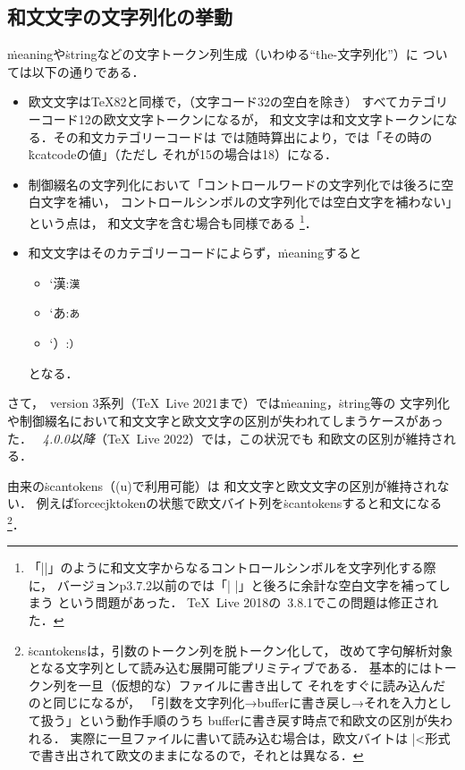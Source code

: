 \documentclass[a4paper,11pt,nomag,dvipdfmx]{jsarticle}
\begin{document}
\subsection{和文文字の文字列化の挙動}%
\label{sec:printkanji16bit}
\.{meaning}や\.{string}などの文字トークン列生成（いわゆる“\.{the}-文字列化”）に
ついては以下の通りである．
\begin{itemize}
  \item 欧文文字は\TeX82と同様で，（文字コード32の空白を除き）
    すべてカテゴリーコード12の欧文文字トークンになるが，
    和文文字は和文文字トークンになる．その和文カテゴリーコードは
    \pTeX では随時算出により，\upTeX では「その時の\.{kcatcode}の値」（ただし
    それが15の場合は18）になる．
  \item 制御綴名の文字列化において「コントロールワードの文字列化では後ろに空白文字を補い，
    コントロールシンボルの文字列化では空白文字を補わない」という点は，
    和文文字を含む場合も同様である
    \footnote{「|\】|」のように和文文字からなるコントロールシンボルを文字列化する際に，
      バージョンp3.7.2以前の\pTeX では「|\】 |」と後ろに余計な空白文字を補ってしまう
      という問題があった．
      \TeX~Live 2018の\pTeX~3.8.1でこの問題は修正された\cite{tjb37}．}．
  \item 和文文字はそのカテゴリーコードによらず，\.{meaning}すると
    \begin{itemize}%
      \item \the\kcatcode`漢:\quad \texttt{\meaning 漢}
      \item \the\kcatcode`あ:\quad \texttt{\meaning あ}
      \item \the\kcatcode`）:\quad \texttt{\meaning ）}
    \end{itemize}
    となる．
\end{itemize}

さて，\pTeX~version 3系列（\TeX~Live 2021まで）では\.{meaning}，\.{string}等の
文字列化や制御綴名において和文文字と欧文文字の区別が失われてしまうケースがあった．
\emph{\pTeX~4.0.0以降}（\TeX~Live 2022）では，この状況でも
和欧文の区別が維持される\cite{tjb81}．
\begin{dangerous}
\eTeX 由来の\.{scantokens}（\eTeXpre(u)\pTeX で利用可能）は
和文文字と欧文文字の区別が維持されない．
例えば\.{forcecjktoken}の状態で欧文バイト列を\.{scantokens}すると和文になる
\footnote{\.{scantokens}は，引数のトークン列を脱トークン化して，
改めて字句解析対象となる文字列として読み込む展開可能プリミティブである．
基本的にはトークン列を一旦（仮想的な）ファイルに書き出して
それをすぐに読み込んだのと同じになるが，
「引数を文字列化→bufferに書き戻し→それを入力として扱う」という動作手順のうち
bufferに書き戻す時点で和欧文の区別が失われる．
実際に一旦ファイルに書いて読み込む場合は，欧文バイトは
|^^|形式で書き出されて欧文のままになるので，それとは異なる．}．
\end{dangerous}
\end{document}
